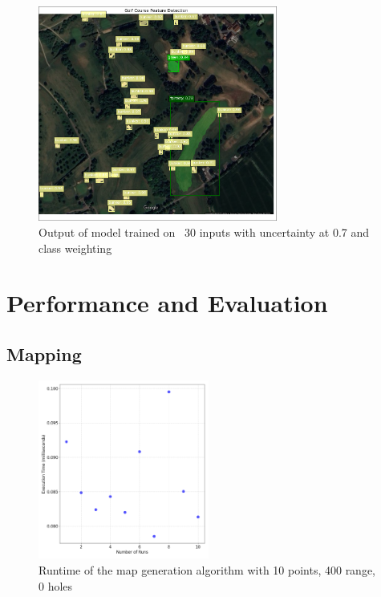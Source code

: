 \documentclass[final]{cmpreport_02}
\begin{document}
\begin{figure}[h!]
	\centering
	\includegraphics[width=0.7\textwidth]{./images/AEEnglishCourseResult.png}
	\caption{Output of model trained on ~30 inputs with uncertainty at 0.7 and class weighting}
	\label{am:AEEnglishCourseResult}
\end{figure}



\section{Performance and Evaluation}
\subsection{Mapping}


\begin{figure}[h!]
	\centering
	\includegraphics[width=0.5\textwidth]{./images/mapGenBaselineRT.png}
	\caption{Runtime of the map generation algorithm with 10 points, 400 range, 0 holes}
	\label{PE:mg:baselineRT}
\end{figure}
\end{document}
